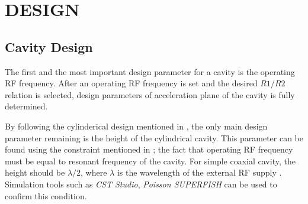\documentclass[a4paper,oneside,12pt]{report}
\numberwithin{equation}{chapter}
\begin{document}
\newpage


\chapter{DESIGN}

\section{Cavity Design} \label{sec:cavity_design}

The first and the most important design parameter for a cavity is the operating RF frequency.
After an operating RF frequency is set and the desired $R1/R2$ relation  is selected, design parameters of acceleration plane of the cavity is fully determined.

By following the cylinderical design mentioned in , the only main design parameter remaining is the height of the cylindrical cavity.
This parameter can be found using the constraint mentioned in ; the fact that operating RF frequency must be equal to resonant frequency of the cavity.
For simple coaxial cavity, the height should be $\lambda/2$, where $\lambda$ is the wavelength of the external RF supply \cite{rhodo_pottier}.
Simulation tools such as \textit{CST Studio}, \textit{Poisson SUPERFISH} can be used to confirm this condition.
\end{document}
